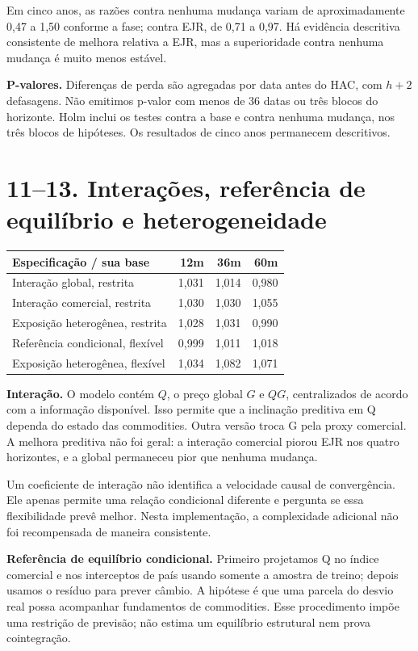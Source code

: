 \documentclass[11pt,a4paper]{article}
\begin{document}
Em cinco anos, as razões contra nenhuma mudança variam de aproximadamente 0,47 a 1,50 conforme a fase; contra EJR, de 0,71 a 0,97. Há evidência descritiva consistente de melhora relativa a EJR, mas a superioridade contra nenhuma mudança é muito menos estável.

\textbf{P-valores.} Diferenças de perda são agregadas por data antes do HAC, com $h+2$ defasagens. Não emitimos p-valor com menos de 36 datas ou três blocos do horizonte. Holm inclui os testes contra a base e contra nenhuma mudança, nos três blocos de hipóteses. Os resultados de cinco anos permanecem descritivos.

\clearpage
\section*{11--13. Interações, referência de equilíbrio e heterogeneidade}\footnotesize\begin{center}\begin{tabular}{lrrr}\toprule
Especificação / sua base & 12m & 36m & 60m \\ \midrule
Interação global, restrita & 1,031 & 1,014 & 0,980 \\
Interação comercial, restrita & 1,030 & 1,030 & 1,055 \\
Exposição heterogênea, restrita & 1,028 & 1,031 & 0,990 \\
Referência condicional, flexível & 0,999 & 1,011 & 1,018 \\
Exposição heterogênea, flexível & 1,034 & 1,082 & 1,071 \\
\bottomrule\end{tabular}\end{center}\normalsize

\textbf{Interação.} O modelo contém $Q$, o preço global $G$ e $QG$, centralizados de acordo com a informação disponível. Isso permite que a inclinação preditiva em Q dependa do estado das commodities. Outra versão troca G pela proxy comercial. A melhora preditiva não foi geral: a interação comercial piorou EJR nos quatro horizontes, e a global permaneceu pior que nenhuma mudança.

Um coeficiente de interação não identifica a velocidade causal de convergência. Ele apenas permite uma relação condicional diferente e pergunta se essa flexibilidade prevê melhor. Nesta implementação, a complexidade adicional não foi recompensada de maneira consistente.

\textbf{Referência de equilíbrio condicional.} Primeiro projetamos Q no índice comercial e nos interceptos de país usando somente a amostra de treino; depois usamos o resíduo para prever câmbio. A hipótese é que uma parcela do desvio real possa acompanhar fundamentos de commodities. Esse procedimento impõe uma restrição de previsão; não estima um equilíbrio estrutural nem prova cointegração.
\end{document}
